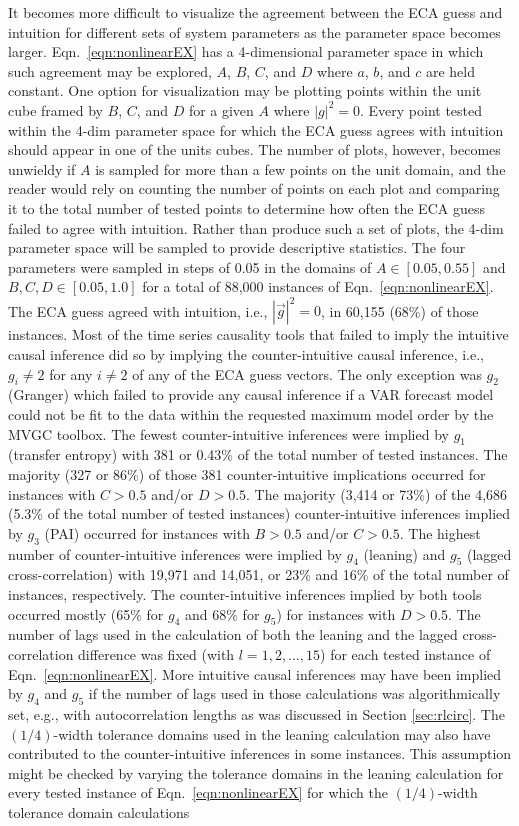 It becomes more difficult to visualize the agreement between the ECA guess and intuition for different sets of system parameters as the parameter space becomes larger.  Eqn.\ \ref{eqn:nonlinearEX} has a 4-dimensional parameter space in which such agreement may be explored, $A$, $B$, $C$, and $D$ where $a$, $b$, and $c$ are held constant.  One option for visualization may be plotting points within the unit cube framed by $B$, $C$, and $D$ for a given $A$ where $|g|^2 = 0$.  Every point tested within the 4-dim parameter space for which the ECA guess agrees with intuition should appear in one of the units cubes.  The number of plots, however, becomes unwieldy if $A$ is sampled for more than a few points on the unit domain, and the reader would rely on counting the number of points on each plot and comparing it to the total number of tested points to determine how often the ECA guess failed to agree with intuition.  Rather than produce such a set of plots, the 4-dim parameter space will be sampled to provide descriptive statistics.  The four parameters were sampled in steps of 0.05 in the domains of $A\in[0.05,0.55]$ and $B,C,D\in[0.05,1.0]$ for a total of 88,000 instances of Eqn.\ \ref{eqn:nonlinearEX}.  The ECA guess agreed with intuition, i.e., $|\vec{g}|^2=0$, in 60,155 (68\%) of those instances.  Most of the time series causality tools that failed to imply the intuitive causal inference did so by implying the counter-intuitive causal inference, i.e., $g_i\neq 2$ for any $i\neq 2$ of any of the ECA guess vectors.  The only exception was $g_2$ (Granger) which failed to provide any causal inference if a VAR forecast model could not be fit to the data within the requested maximum model order by the MVGC toolbox.  The fewest counter-intuitive inferences were implied by $g_1$ (transfer entropy) with 381 or 0.43\% of the total number of tested instances.  The majority (327 or 86\%) of those 381 counter-intuitive implications occurred for instances with $C>0.5$ and/or $D>0.5$.  The majority (3,414 or 73\%) of the 4,686 (5.3\% of the total number of tested instances) counter-intuitive inferences implied by $g_3$ (PAI) occurred for instances with $B>0.5$ and/or $C>0.5$.  The highest number of counter-intuitive inferences were implied by $g_4$ (leaning) and $g_5$ (lagged cross-correlation) with 19,971 and 14,051, or 23\% and 16\% of the total number of instances, respectively.  The counter-intuitive inferences implied by both tools occurred mostly (65\% for $g_4$ and 68\% for $g_5$) for instances with $D>0.5$.  The number of lags used in the calculation of both the leaning and the lagged cross-correlation difference was fixed (with $l=1,2,\ldots,15$) for each tested instance of Eqn.\ \ref{eqn:nonlinearEX}.  More intuitive causal inferences may have been implied by $g_4$ and $g_5$ if the number of lags used in those calculations was algorithmically set, e.g., with autocorrelation lengths as was discussed in Section \ref{sec:rlcirc}.  The $(1/4)$-width tolerance domains used in the leaning calculation may also have contributed to the counter-intuitive inferences in some instances. This assumption might be checked by varying the tolerance domains in the leaning calculation for every tested instance of Eqn.\ \ref{eqn:nonlinearEX} for which the $(1/4)$-width tolerance domain calculations 